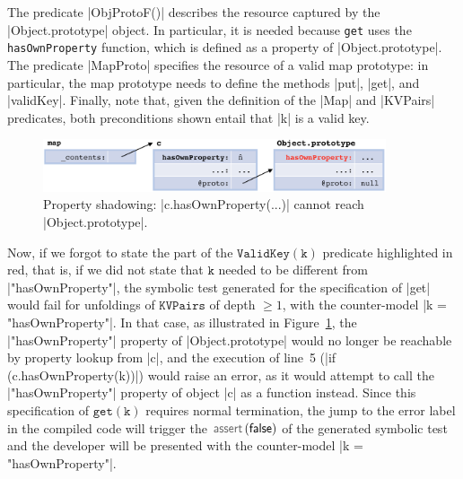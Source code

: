 \vspace{10pt}
The predicate \jsinline|ObjProtoF()| describes the resource captured by the \jsinline|Object.prototype| object. 
In particular, it is needed because \texttt{get} uses the \texttt{hasOwnProperty} function, which is defined as a property of \jsinline|Object.prototype|. 
The predicate \jsinline|MapProto| specifies the resource of a valid map prototype: in particular, the map prototype needs to define the methods \jsinline|put|, \jsinline|get|, and \jsinline|validKey|. Finally, note that, given the definition of the \jsinline|Map| and \jsinline|KVPairs| predicates, both preconditions shown entail that \jsinline|k| is a valid key.

\begin{figure}[t!]
\centering
\includegraphics[width=0.9\textwidth]{figures/heapfail.png}
\caption{Property shadowing: \jsinline|c.hasOwnProperty(...)| cannot reach \jsinline|Object.prototype|.} 
\label{fig:cexget}
\vspace{-0.5cm}
\end{figure}

Now, if we forgot to state the part of the $\mathtt{ValidKey(k)}$ predicate highlighted in red, that is, if we did not state that $\mathtt{k}$ needed to be different from \jsinline|"hasOwnProperty"|, the symbolic test generated for the specification of \jsinline|get| would fail for unfoldings of $\mathtt{KVPairs}$ of depth $\geq 1$, with the counter-model \jsinline|k = "hasOwnProperty"|. 
In that case, as illustrated in Figure~\ref{fig:cexget}, the \jsinline|"hasOwnProperty"| property of \jsinline|Object.prototype| would no longer be reachable by property lookup from \jsinline|c|, and
the execution of line~5 (\jsinline|if (c.hasOwnProperty(k))|) would raise an error, as it would attempt to call the \jsinline|"hasOwnProperty"| property of object \jsinline|c| as a function instead. 
Since this specification of $\mathtt{get(k)}$ requires normal termination, the jump to the error label in the compiled \jsil code will trigger the $\assert(\jfalse)$ of the generated symbolic test and the developer will be presented with the counter-model \jsinline|k = "hasOwnProperty"|.
